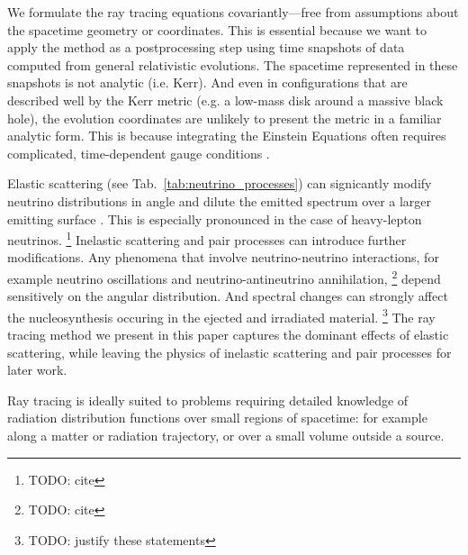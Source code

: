 \documentclass[aps,floatfix,prd,superscriptaddress,twocolumn]{revtex4-1}
\begin{document}
We formulate the ray tracing equations covariantly---free from
assumptions about the spacetime geometry or coordinates. This is essential
because we want to apply the method as a postprocessing step using
time snapshots of data computed from general relativistic evolutions.
The spacetime represented in these snapshots is not analytic (i.e. Kerr).
And even in configurations that are described well by the Kerr metric
(e.g. a low-mass disk around a massive black hole),
the evolution coordinates are unlikely to present the metric in
a familiar analytic form.
This is because integrating the Einstein Equations often requires complicated,
time-dependent gauge conditions
\citep{lind2007-gen_harmonic, fouc2013-compactness_and_spin}.

Elastic scattering (see Tab.~\ref{tab:neutrino_processes}) can signicantly
modify neutrino distributions in angle and dilute the emitted spectrum over a
larger emitting surface \citep{pere2016-asl}.
This is especially pronounced in the case of heavy-lepton neutrinos.
\footnote{TODO: cite}
Inelastic scattering and pair processes can introduce further modifications.
Any phenomena that involve neutrino-neutrino interactions,
for example neutrino oscillations and neutrino-antineutrino annihilation,
\footnote{TODO: cite}
depend sensitively on the angular distribution.
And spectral changes can strongly affect the nucleosynthesis
occuring in the ejected and irradiated material.
\footnote{TODO: justify these statements}
The ray tracing method we present in this paper captures the dominant effects
of elastic scattering, while leaving the physics of inelastic scattering and
pair processes for later work.

Ray tracing is ideally suited to problems requiring detailed knowledge of
radiation distribution functions over small regions of spacetime:
for example along a matter or radiation trajectory,
or over a small volume outside a source.
\end{document}
